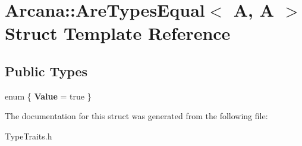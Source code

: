 \hypertarget{struct_arcana_1_1_are_types_equal_3_01_a_00_01_a_01_4}{}\section{Arcana\+:\+:Are\+Types\+Equal$<$ A, A $>$ Struct Template Reference}
\label{struct_arcana_1_1_are_types_equal_3_01_a_00_01_a_01_4}
\subsection*{Public Types}
\begin{DoxyCompactItemize}
\item 
\mbox{\label{struct_arcana_1_1_are_types_equal_3_01_a_00_01_a_01_4_a8b24f46752d73cfdb5eb9b5e300702cd}} 
enum \{ {\bfseries Value} = true
 \}
\end{DoxyCompactItemize}


The documentation for this struct was generated from the following file\+:\begin{DoxyCompactItemize}
\item 
Type\+Traits.\+h\end{DoxyCompactItemize}
